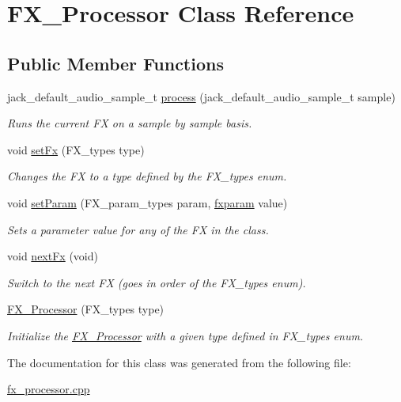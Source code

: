 \hypertarget{class_f_x___processor}{\section{F\+X\+\_\+\+Processor Class Reference}
\label{class_f_x___processor}
}
\subsection*{Public Member Functions}
\begin{DoxyCompactItemize}
\item 
jack\+\_\+default\+\_\+audio\+\_\+sample\+\_\+t \hyperlink{group__fx_ga28c21e02acafee81891aa7a841a9eb2b}{process} (jack\+\_\+default\+\_\+audio\+\_\+sample\+\_\+t sample)
\begin{DoxyCompactList}\small\item\em Runs the current F\+X on a sample by sample basis. \end{DoxyCompactList}\item 
void \hyperlink{group__fx_ga5e82105e6948cefc5dd0233e55c2afe0}{set\+Fx} (F\+X\+\_\+types type)
\begin{DoxyCompactList}\small\item\em Changes the F\+X to a type defined by the F\+X\+\_\+types enum. \end{DoxyCompactList}\item 
void \hyperlink{group__fx_ga02c602d1dd654bc0115b2a600bd3937f}{set\+Param} (F\+X\+\_\+param\+\_\+types param, \hyperlink{group__fx_ga206aa2d2b25bdca17a838a03412b11f7}{fxparam} value)
\begin{DoxyCompactList}\small\item\em Sets a parameter value for any of the F\+X in the class. \end{DoxyCompactList}\item 
void \hyperlink{group__fx_ga3db35d06ad4816d43fdee58396a2aa8e}{next\+Fx} (void)
\begin{DoxyCompactList}\small\item\em Switch to the next F\+X (goes in order of the F\+X\+\_\+types enum). \end{DoxyCompactList}\item 
\hyperlink{group__fx_ga7ca5d9ae276fae16385774dd650a463b}{F\+X\+\_\+\+Processor} (F\+X\+\_\+types type)
\begin{DoxyCompactList}\small\item\em Initialize the \hyperlink{class_f_x___processor}{F\+X\+\_\+\+Processor} with a given type defined in F\+X\+\_\+types enum. \end{DoxyCompactList}\end{DoxyCompactItemize}


The documentation for this class was generated from the following file\+:\begin{DoxyCompactItemize}
\item 
\hyperlink{fx__processor_8cpp}{fx\+\_\+processor.\+cpp}\end{DoxyCompactItemize}
